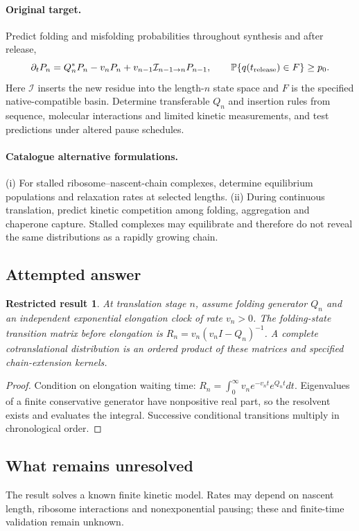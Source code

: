 \documentclass[11pt]{article}
\newcommand{\Prob}{\mathbb P}
\providecommand{\Prob}{\mathbb P}
\newtheorem{attemptresult}{Restricted result}[section]
\begin{document}
\paragraph{Original target.}
Predict folding and misfolding probabilities throughout synthesis and after release,
\[\partial_tP_n=Q_n^*P_n-v_nP_n+v_{n-1}\mathcal I_{n-1\to n}P_{n-1},\qquad \Prob\{q(t_{\rm release})\in F\}\ge p_0.\]
Here $\mathcal I$ inserts the new residue into the length-$n$ state space and $F$ is the specified native-compatible basin. Determine transferable $Q_n$ and insertion rules from sequence, molecular interactions and limited kinetic measurements, and test predictions under altered pause schedules.
\paragraph{Catalogue alternative formulations.}
(i) For stalled ribosome--nascent-chain complexes, determine equilibrium populations and relaxation rates at selected lengths. (ii) During continuous translation, predict kinetic competition among folding, aggregation and chaperone capture. Stalled complexes may equilibrate and therefore do not reveal the same distributions as a rapidly growing chain.
\subsection{Attempted answer}
\begin{attemptresult}
At translation stage $n$, assume folding generator $Q_n$ and an independent exponential elongation clock of rate $v_n>0$. The folding-state transition matrix before elongation is $R_n=v_n(v_nI-Q_n)^{-1}$. A complete cotranslational distribution is an ordered product of these matrices and specified chain-extension kernels.
\end{attemptresult}
\begin{proof}
Condition on elongation waiting time: $R_n=\int_0^\infty v_ne^{-v_nt}e^{Q_nt}dt$. Eigenvalues of a finite conservative generator have nonpositive real part, so the resolvent exists and evaluates the integral. Successive conditional transitions multiply in chronological order.
\end{proof}
\subsection{What remains unresolved}
The result solves a known finite kinetic model. Rates may depend on nascent length, ribosome interactions and nonexponential pausing; these and finite-time validation remain unknown.
\end{document}
